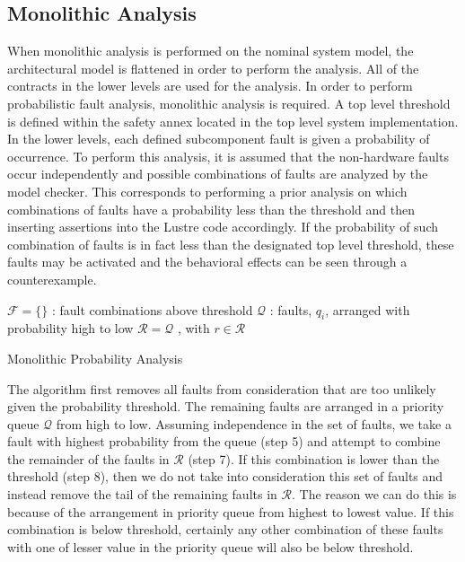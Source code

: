 \subsection{Monolithic Analysis}
When monolithic analysis is performed on the nominal system model, the architectural model is flattened in order to perform the analysis. All of the contracts in the lower levels are used for the analysis. In order to perform probabilistic fault analysis, monolithic analysis is required. A top level threshold is defined within the safety annex located in the top level system implementation. In the lower levels, each defined subcomponent fault is given a probability of occurrence. To perform this analysis, it is assumed that the non-hardware faults occur independently and possible combinations of faults are analyzed by the model checker. This corresponds to performing a prior analysis on which combinations of faults have a probability less than the threshold and then inserting assertions into the Lustre code accordingly. If the probability of such combination of faults is in fact less than the designated top level threshold, these faults may be activated and the behavioral effects can be seen through a counterexample.  

\begin{algorithm}[H]
 $\mathcal{F} = \{\}$ : fault combinations above threshold \;
 $\mathcal{Q}$ : faults, $q_i$, arranged with probability high to low \;
 $\mathcal{R} = \mathcal{Q}$ , with $r \in \mathcal{R}$\;
 \caption{Monolithic Probability Analysis}
\end{algorithm}

The algorithm first removes all faults from consideration that are too unlikely given the probability threshold. The remaining faults are arranged in a priority queue $\mathcal{Q}$ from high to low. Assuming independence in the set of faults, we take a fault with highest probability from the queue (step 5) and attempt to combine the remainder of the faults in $\mathcal{R}$ (step 7). If this combination is lower than the threshold (step 8), then we do not take into consideration this set of faults and instead remove the tail of the remaining faults in $\mathcal{R}$. The reason we can do this is because of the arrangement in priority queue from highest to lowest value. If this combination is below threshold, certainly any other combination of these faults with one of lesser value in the priority queue will also be below threshold. 
 
